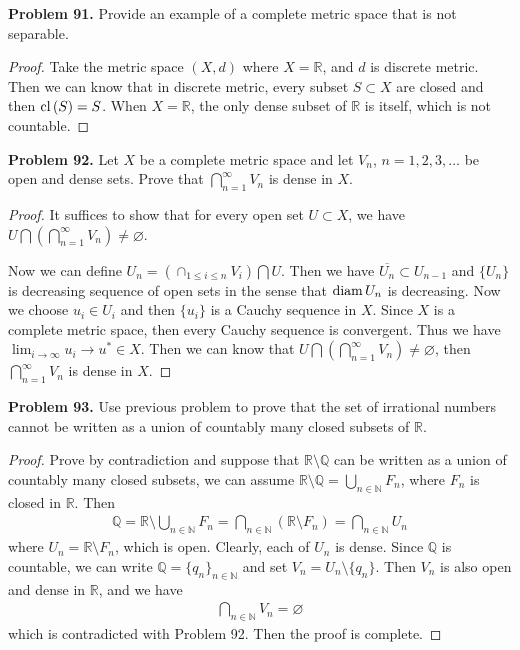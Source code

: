 \documentclass[12pt,leqno]{amsart}
\theoremstyle{definition}
\numberwithin{equation}{subsection}
\begin{document}
\medskip

\noindent
{\bf Problem 91.}
Provide an example of a complete metric space that is not separable.
\begin{proof}
Take the metric space $(X,d)$ where $X = \mathbb{R}$, and $d$ is discrete metric. Then we can know that in discrete metric, every subset $S\subset X$ are closed and then ${\rm cl}\,(S) = S$. When $X = \mathbb{R}$, the only dense subset of $\mathbb{R}$ is itself, which is not countable.
\end{proof}

\medskip

\noindent
{\bf Problem 92.}
Let $X$ be a complete metric space and let $V_n$, $n = 1,2,3,\ldots$ be open and dense sets. Prove that $\bigcap^\infty_{n=1} V_n$ is dense in $X$.
\begin{proof}
It suffices to show that for every open set $U\subset X$, we have $U \bigcap \left(\bigcap^\infty_{n=1} V_n\right) \neq \varnothing$. 

Now we can define $U_n = \left(\cap_{1\leq i\leq n}V_i\right)\bigcap U$. Then we have $\overline{U_n}\subset U_{n-1}$ and $\{U_n\}$ is decreasing sequence of open sets in the sense that ${\rm diam}\, U_n$ is decreasing. Now we choose $u_i\in U_i$ and then $\{u_i\}$ is a Cauchy sequence in $X$. Since $X$ is a complete metric space, then every Cauchy sequence is convergent. Thus we have $\lim_{i\to\infty}u_i\to u^* \in X$. Then we can know that $U \bigcap \left(\bigcap^\infty_{n=1} V_n\right) \neq \varnothing$, then $\bigcap^\infty_{n=1} V_n$ is dense in $X$.
\end{proof}

\medskip

\noindent
{\bf Problem 93.}
Use previous problem to prove that the set of irrational numbers cannot be written as a union of countably many closed subsets of $\mathbb{R}$.

\begin{proof}
Prove by contradiction and suppose that $\mathbb{R}\setminus\mathbb{Q}$ can be written as a union of countably many closed subsets, we can assume $\mathbb{R}\setminus\mathbb{Q} = \bigcup_{n\in\mathbb{N}}F_n$, where $F_n$ is closed in $\mathbb{R}$. Then
\begin{align*}
    \mathbb{Q} = \mathbb{R}\setminus \bigcup_{n\in\mathbb{N}}F_n = \bigcap_{n\in\mathbb{N}}\left(\mathbb{R}\setminus F_n\right) = \bigcap_{n\in\mathbb{N}} U_n
\end{align*}
where $U_n = \mathbb{R}\setminus F_n$, which is open. Clearly, each of $U_n$ is dense. Since $\mathbb{Q}$ is countable, we can write $\mathbb{Q} = \{q_n\}_{n\in\mathbb{N}}$ and set $V_n = U_n\setminus \{q_n\}$. Then $V_n$ is also open and dense in $\mathbb{R}$, and we have 
\begin{align*}
    \bigcap_{n\in\mathbb{N}} V_n = \varnothing
\end{align*}
which is contradicted with Problem 92. Then the proof is complete.
\end{proof}
\end{document}
